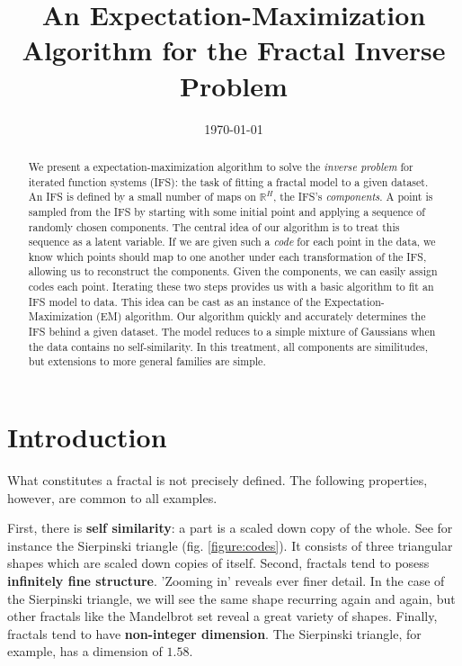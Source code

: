 \documentclass[10pt,a4paper,oneside]{article}
\title{An Expectation-Maximization Algorithm for the Fractal Inverse Problem}
\date{\today}
\theoremstyle{definition}
\theoremstyle{definition}
\begin{document}
\maketitle

\begin{abstract}
\noindent We present a expectation-maximization algorithm to solve the \emph{inverse problem} for iterated function systems (IFS): the task of fitting a fractal model to a given dataset. An IFS is defined by a small number of maps on $\mathbb{R}^H$, the IFS's \emph{components}. A point is sampled from the IFS by starting with some initial point and applying a sequence of randomly chosen components. The central idea of our algorithm is to treat this sequence as a latent variable. If we are given such a \emph{code} for each point in the data, we know which points should map to one another under each transformation of the IFS, allowing us to reconstruct the components. Given the components, we can easily assign codes each point. Iterating these two steps provides us with a basic algorithm to fit an IFS model to data. This idea can be cast as an instance of the Expectation-Maximization (EM) algorithm. Our algorithm  quickly and accurately determines the IFS behind a given dataset. The model reduces to a simple mixture of Gaussians when the data contains no self-similarity. In this treatment, all components are similitudes, but extensions to more general families are simple. 
\end{abstract}

\section{Introduction}
What constitutes a fractal is not precisely defined\footnotemark. The following properties, however, are common to all examples.

First, there is \textbf{self similarity}: a part is a scaled down copy of the whole. See for instance the Sierpinski triangle (fig. \ref{figure:codes}). It consists of three triangular shapes which are scaled down copies of itself. Second, fractals tend to posess \textbf{infinitely fine structure}. 'Zooming in' reveals ever finer detail. In the case of the Sierpinski triangle, we will see the same shape recurring again and again, but other fractals like the Mandelbrot set reveal a great variety of shapes.
Finally, fractals tend to have \textbf{non-integer dimension}. The Sierpinski triangle, for example, has a dimension of $1.58$. 
\end{document}
